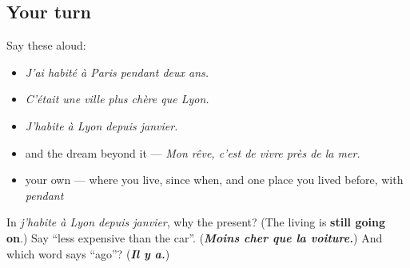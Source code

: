 \subsection*{Your turn}
Say these aloud:

\begin{itemize}
\raggedright
  \item \emph{J'ai habité à Paris pendant deux ans.}
  \item \emph{C'était une ville plus chère que Lyon.}
  \item \emph{J'habite à Lyon depuis janvier.}
  \item and the dream beyond it — \emph{Mon rêve, c'est de vivre près de la mer.}
  \item your own — where you live, since when, and one place you lived before, with \emph{pendant}
\end{itemize}

\begin{tcolorbox}[breakable,colback=teal!4,colframe=teal!35!black,title={Before you move on}]
In \emph{j'habite à Lyon depuis janvier}, why the present? (The living is \textbf{still going on}.) Say \textquotedblleft{}less expensive than the car\textquotedblright{}. (\emph{\textbf{Moins cher que la voiture.}}) And which word says \textquotedblleft{}ago\textquotedblright{}? (\emph{\textbf{Il y a.}})
\end{tcolorbox}
